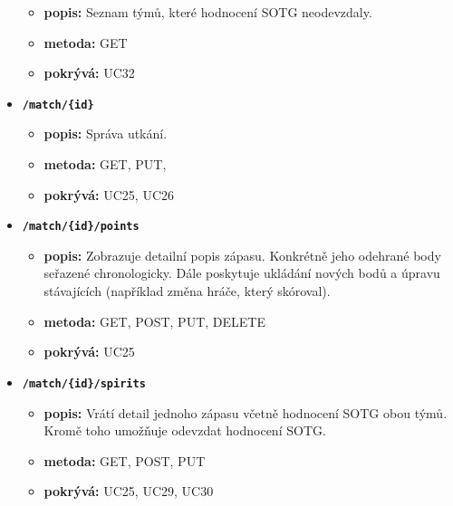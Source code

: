\begin{itemize}
  \begin{itemize}
    \item \textbf{popis:} Seznam týmů, které hodnocení SOTG neodevzdaly.
    \item \textbf{metoda:} GET
    \item \textbf{pokrývá:} UC32
  \end{itemize}
  \item \texttt{\textbf{/match/\{id\}}}
  \begin{itemize}
    \item \textbf{popis:} Správa utkání.
    \item \textbf{metoda:} GET, PUT, 
    \item \textbf{pokrývá:} UC25, UC26
  \end{itemize}
  \pagebreak
  \item \texttt{\textbf{/match/\{id\}/points}}
  \begin{itemize}
    \item \textbf{popis:} Zobrazuje detailní popis zápasu. Konkrétně jeho odehrané body seřazené chronologicky.
      Dále poskytuje ukládání nových bodů a úpravu stávajících (například změna hráče, který skóroval).
    \item \textbf{metoda:} GET, POST, PUT, DELETE
    \item \textbf{pokrývá:} UC25
  \end{itemize}
  \item \texttt{\textbf{/match/\{id\}/spirits}}
  \begin{itemize}
    \item \textbf{popis:} Vrátí detail jednoho zápasu včetně hodnocení SOTG obou týmů. Kromě toho umožňuje odevzdat hodnocení SOTG.
    \item \textbf{metoda:} GET, POST, PUT
    \item \textbf{pokrývá:} UC25, UC29, UC30
  \end{itemize}
\end{itemize}